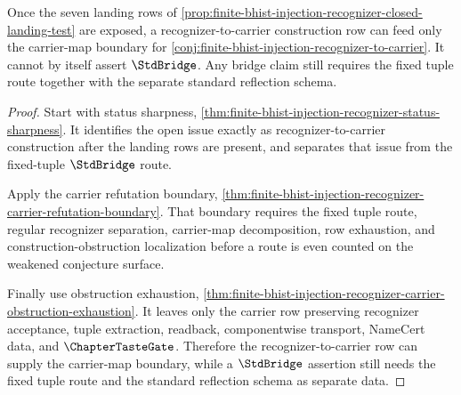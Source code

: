 \begin{theorem}
\label{thm:finite-bhist-injection-recognizer-no-stdbridge-upgrade}
Once the seven landing rows of
\autoref{prop:finite-bhist-injection-recognizer-closed-landing-test} are
exposed, a recognizer-to-carrier construction row can feed only the
carrier-map boundary for
\autoref{conj:finite-bhist-injection-recognizer-to-carrier}. It cannot by
itself assert $\StdBridge$. Any bridge claim still requires the fixed tuple
route together with the separate standard reflection schema.
\end{theorem}
\begin{proof}
Start with status sharpness,
\autoref{thm:finite-bhist-injection-recognizer-status-sharpness}. It identifies
the open issue exactly as recognizer-to-carrier construction after the landing
rows are present, and separates that issue from the fixed-tuple $\StdBridge$
route.

Apply the carrier refutation boundary,
\autoref{thm:finite-bhist-injection-recognizer-carrier-refutation-boundary}.
That boundary requires the fixed tuple route, regular recognizer separation,
carrier-map decomposition, row exhaustion, and construction-obstruction
localization before a route is even counted on the weakened conjecture
surface.

Finally use obstruction exhaustion,
\autoref{thm:finite-bhist-injection-recognizer-carrier-obstruction-exhaustion}.
It leaves only the carrier row preserving recognizer acceptance, tuple
extraction, readback, componentwise transport, NameCert data, and
$\ChapterTasteGate$. Therefore the recognizer-to-carrier row can supply the
carrier-map boundary, while a $\StdBridge$ assertion still needs the fixed
tuple route and the standard reflection schema as separate data.
\end{proof}

